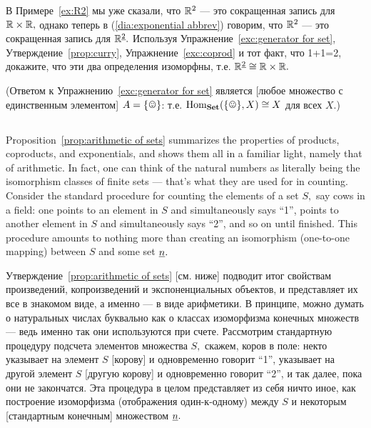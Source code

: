\documentclass[CT4S-EN-RU]{subfiles}
\begin{document}
\begin{exerciseRUS}\label{exc:two R2s}
В Примере~\ref{ex:R2} мы уже сказали, что ${\mathbb R}^2$ — это сокращенная запись для ${\mathbb R}\times{\mathbb R},$ однако теперь в (\ref{dia:exponential abbrev}) говорим, что ${\mathbb R}^2$ — это сокращенная запись для ${\mathbb R}^{\underline{2}}.$ Используя Упражнение~\ref{exc:generator for set}, Утверждение~\ref{prop:curry}, Упражнение~\ref{exc:coprod} и тот факт, что 1+1=2, докажите, что эти два определения изоморфны, т.е. ${\mathbb R}^{\underline{2}}\cong{\mathbb R}\times{\mathbb R}.$

(Ответом к Упражнению~\ref{exc:generator for set} является [любое множество с единственным элементом] $A=\singleton$: т.е. $\Hom_\Set(\singleton,X)\iso X$ для всех $X.$)
\end{exerciseRUS}


\subsection{}\label{sec:arithmetic of sets}

\begin{blockENG}
Proposition~\ref{prop:arithmetic of sets} summarizes the properties of products, coproducts, and exponentials, and shows them all in a familiar light, namely that of arithmetic. In fact, one can think of the natural numbers as literally being the isomorphism classes of finite sets — that's what they are used for in counting. Consider the standard procedure for counting the elements of a set $S,$ say cows in a field: one points to an element in $S$ and simultaneously says “1”, points to another element in $S$ and simultaneously says “2”, and so on until finished. This procedure amounts to nothing more than creating an isomorphism (one-to-one mapping) between $S$ and some set $\underline{n}.$ 
\end{blockENG}

\begin{blockRUS}
Утверждение~\ref{prop:arithmetic of sets} [см. ниже] подводит итог свойствам произведений, копроизведений и экспоненциальных объектов, и представляет их все в знакомом виде, а именно — в виде арифметики. В принципе, можно думать о натуральных числах буквально как о классах изоморфизма конечных множеств — ведь именно так они используются при счете. Рассмотрим стандартную процедуру подсчета элементов множества $S,$ скажем, коров в поле: некто указывает на элемент $S$ [корову] и одновременно говорит “1”, указывает на другой элемент $S$ [другую корову] и одновременно говорит “2”, и так далее, пока они не закончатся. Эта процедура в целом представляет из себя ничто иное, как построение изоморфизма (отображения один-к-одному) между $S$ и некоторым [стандартным конечным] множеством $\underline{n}.$ 
\end{blockRUS}
\end{document}
